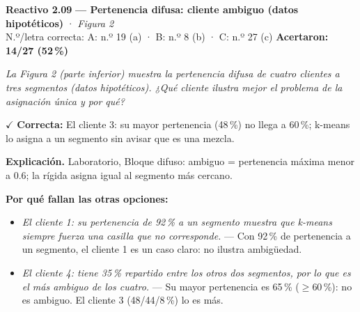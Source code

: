 \documentclass[10pt,letterpaper]{article}
\begin{document}
\begin{minipage}{\textwidth}
{\color{guinda}\textbf{Reactivo 2.09}} \textbf{— Pertenencia difusa: cliente ambiguo (datos hipotéticos)} · \textit{Figura 2}\\[-1pt]
{\scriptsize N.º/letra correcta: A: n.º 19 (a) · B: n.º 8 (b) · C: n.º 27 (c) \hfill \textbf{Acertaron: 14/27 (52\,\%)}}

\textit{La Figura 2 (parte inferior) muestra la pertenencia difusa de cuatro clientes a tres segmentos (datos hipotéticos). ¿Qué cliente ilustra mejor el problema de la asignación única y por qué?}

\textcolor{verde}{$\checkmark$} \textbf{Correcta:} El cliente 3: su mayor pertenencia (48\,\%) no llega a 60\,\%; k-means lo asigna a un segmento sin avisar que es una mezcla.

\textbf{Explicación.} Laboratorio, Bloque difuso: ambiguo = pertenencia máxima menor a 0.6; la rígida asigna igual al segmento más cercano.

\textbf{Por qué fallan las otras opciones:}
\begin{itemize}[itemsep=0pt,topsep=1pt,leftmargin=1.3em,parsep=0pt]
\item[\textcolor{rojo}{$\times$}] \textit{El cliente 1: su pertenencia de 92\,\% a un segmento muestra que k-means siempre fuerza una casilla que no corresponde.} --- Con 92\,\% de pertenencia a un segmento, el cliente 1 es un caso claro: no ilustra ambigüedad.
\item[\textcolor{rojo}{$\times$}] \textit{El cliente 4: tiene 35\,\% repartido entre los otros dos segmentos, por lo que es el más ambiguo de los cuatro.} --- Su mayor pertenencia es 65\,\% ($\ge60$\,\%): no es ambiguo. El cliente 3 (48/44/8\,\%) lo es más.
\end{itemize}
\end{minipage}\par\vspace{5pt}{\color{gray!40}\hrule}\vspace{5pt}
\end{document}
